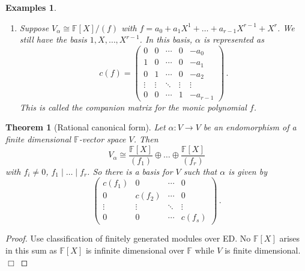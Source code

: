 \documentclass{article}
\theoremstyle{plain}\theoremheaderfont{\normalfont\itshape}\theorembodyfont{\rmfamily}\theoremseparator{.}\newtheorem*{rem}{Remark}\newtheorem*{ex}{Example}\newtheorem*{proof}{Proof}\newtheorem*{altp}{Alternative proof}\newtheorem*{nonex}{Non-Example}
\theoremstyle{plain}\theoremheaderfont{\normalfont\bfseries}\theorembodyfont{\rmfamily}\theoremseparator{.}\newtheorem{thm}{Theorem}[section]\newtheorem{lem}[thm]{Lemma}\newtheorem{prop}[thm]{Proposition}\newtheorem*{cor}{Corollary}\newtheorem{defn}[thm]{Definition}\newtheorem{clm}[thm]{Claim}\newtheorem{clminproof}{Claim}\newtheorem*{notn}{Notation}\newtheorem*{exer}{Exercise}\newtheorem*{lemnn}{Lemma}
\theoremstyle{break}\theoremheaderfont{\normalfont\itshape}\theorembodyfont{\rmfamily}\theoremseparator{.\medskip}\newtheorem*{proofskip}{Proof}\newtheorem*{exs}{Examples}\newtheorem*{rems}{Remarks}\newtheorem*{obs}{Observations}
\theoremstyle{break}\theoremheaderfont{\normalfont\bfseries}\theorembodyfont{\rmfamily}\theoremseparator{.\medskip}\newtheorem{lemskip}[thm]{Lemma}\newtheorem{defnskip}[thm]{Definition}\newtheorem{propskip}[thm]{Proposition}\newtheorem{thmskip}[thm]{Theorem}
\numberwithin{equation}{section}
\newcommand{\qed}{\hfill\ensuremath{\Box}}
\newcommand{\FF}{\mathbb{F}}
\begin{document}
\begin{exs}
\begin{enumerate}[topsep=0pt,label=(\roman*)]
\[\begin{pmatrix}
                \vdots & \vdots & \ddots & \vdots & \vdots \\
                0 & 0 & \cdots & 1 & \lambda
            \end{pmatrix}\,.\]
            This is a Jordan normal block of size \(r\) with eigenvalue \(\lambda\).
            \item Suppose \(V_\alpha\cong\FF[X]/(f)\) with \(f=a_0+a_1X^1+\dots+a_{r-1}X^{r-1}+X^r\). We still have the basis \(1,X,\dots,X^{r-1}\).  In this basis, \(\alpha\) is represented as
            \[c(f)=\begin{pmatrix}
                0 & 0 & \cdots & 0 & -a_0\\
                1 & 0 & \cdots & 0 & -a_1\\
                0 & 1 & \cdots & 0 & -a_2\\
                \vdots & \vdots & \ddots & \vdots & \vdots \\
                0 & 0 & \cdots & 1 & -a_{r-1}
            \end{pmatrix}\,.\]
            This is called the \textit{companion matrix} for the monic polynomial \(f\).
        \end{enumerate}
    \end{exs}
    \begin{thm}[Rational canonical form]
        Let \(\alpha:V\to V\) be an endomorphism of a finite dimensional \(\FF\)-vector space \(V\). Then
        \[V_\alpha\cong\frac{\FF[X]}{(f_1)}\oplus\dots\oplus\frac{\FF[X]}{(f_r)}\]
        with \(f_i\ne 0\), \(f_1\mid\dots\mid f_r\). So there is a basis for \(V\) such that \(\alpha\) is given by
        \[\begin{pmatrix}
            c(f_1) & 0 & \cdots & 0 \\
            0 & c(f_2) & \cdots & 0 \\
            \vdots & \vdots & \ddots & \vdots \\
            0 & 0 & \cdots & c(f_s)
        \end{pmatrix}\,.\]
    \end{thm}
    \begin{proof}
        Use classification of finitely generated modules over ED. No \(\FF[X]\) arises in this sum as \(\FF[X]\) is infinite dimensional over \(\FF\) while \(V\) is finite dimensional.\qed
    \end{proof}
\end{document}

